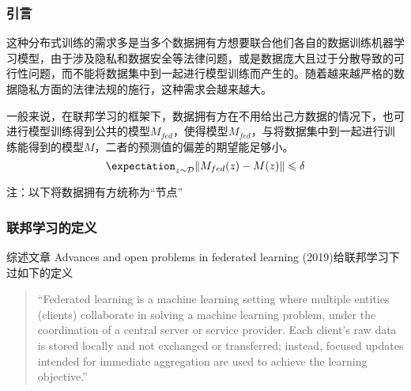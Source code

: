 
\begin{frame}
\frametitle{引言}

这种分布式训练的需求多是当多个数据拥有方想要联合他们各自的数据训练机器学习模型，由于涉及隐私和数据安全等法律问题，或是数据庞大且过于分散导致的可行性问题，而不能将数据集中到一起进行模型训练而产生的。随着越来越严格的数据隐私方面的法律法规的施行，这种需求会越来越大。

\pause
\vspace{0.8em}

一般来说，在联邦学习的框架下，数据拥有方在不用给出己方数据的情况下，也可进行模型训练得到公共的模型$M_{fed}$，使得模型$M_{fed}$，与将数据集中到一起进行训练能得到的模型$M$，二者的预测值的偏差的期望能足够小。
$$\expectation_{z\sim\mathcal{D}} \lVert M_{fed}(z) - M(z) \rVert \leqslant \delta$$

\vspace{0.5em}

{\footnotesize 注：以下将数据拥有方统称为``节点''}

\end{frame}


\begin{frame}
\frametitle{联邦学习的定义}

综述文章\cite{kairouz2019advances_fl} Advances and open problems in federated learning (2019)给联邦学习下过如下的定义

\vspace{0.8em}

\begin{quote}
    ``Federated learning is a machine learning setting where multiple entities (clients) collaborate in solving a machine learning problem, under the coordination of a central server or service provider. Each client's raw data is stored locally and not exchanged or transferred; instead, focused updates intended for immediate aggregation are used to achieve the learning objective.''
\end{quote}

\end{frame}


